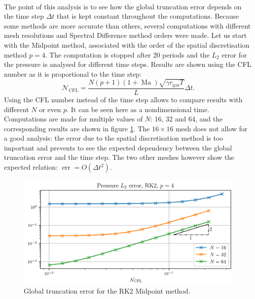       \paragraph{}
      The point of this analysis is to see how the global truncation error depends on the time step $\Delta t$ that is kept constant throughout the computations.
      Because some methods are more accurate than others, several computations with different mesh resolutions and Spectral Difference method orders were made.
      Let us start with the Midpoint method, associated with the order of the spatial discretisation method $p = 4$. The computation is stopped after 20 periods and the $L_2$ error for the pressure is analysed for different time steps.
      Results are shown using the CFL number as it is proportional to the time step:
      \begin{equation}
        \mathcal{N}_\textrm{CFL} = \frac{N \left(p + 1\right) \left(1 + \operatorname{Ma}\right) \sqrt{\gamma r_\textrm{gas} T}}{L} \Delta t .
      \end{equation}
      Using the CFL number instead of the time step allows to compare results with different $N$ or even $p$.
      It can be seen here as a nondimensional time.
      Computations are made for multiple values of $N$: 16, 32 and 64, and the corresponding results are shown in figure \ref{fig:covo_rk2}.
      The $16\times16$ mesh does not allow for a good analysis: the error due to the spatial discretisation method is too important and prevents to see the expected dependency between the global truncation error and the time step.
      The two other meshes however show the expected relation: $\operatorname{err} = O\left(\Delta t^2\right)$.

      \begin{figure}
        \centering
        \includegraphics{figures/covo_rk2.png}
        \caption{Global truncation error for the RK2 Midpoint method.}
        \label{fig:covo_rk2}
      \end{figure}

